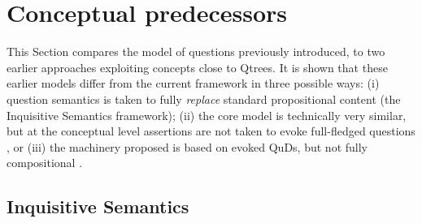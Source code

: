 \section{Conceptual predecessors}\label{chap:lit-review}
This Section compares the model of questions previously introduced, to two earlier approaches exploiting concepts close to Qtrees. It is shown that these earlier models differ from the current framework in three possible ways: (i) question semantics is taken to fully \textit{replace} standard propositional content (the Inquisitive Semantics framework); (ii) the core model is technically very similar, but at the conceptual level assertions are not taken to evoke full-fledged questions \parencite{Ippolito2019}, or (iii) the machinery proposed is based on evoked QuDs, but not fully compositional \parencite{Ippolito2019}.



\subsection{Inquisitive Semantics}

%


